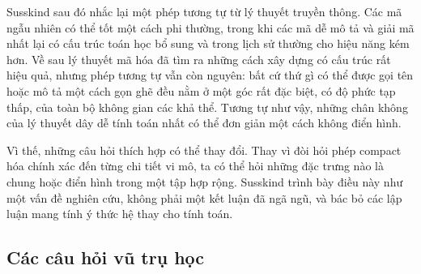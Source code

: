 Susskind sau đó nhắc lại một phép tương tự từ lý thuyết truyền thông. Các mã ngẫu nhiên có thể tốt một cách phi thường, trong khi các mã dễ mô tả và giải mã nhất lại có cấu trúc toán học bổ sung và trong lịch sử thường cho hiệu năng kém hơn. Về sau lý thuyết mã hóa đã tìm ra những cách xây dựng có cấu trúc rất hiệu quả, nhưng phép tương tự vẫn còn nguyên: bất cứ thứ gì có thể được gọi tên hoặc mô tả một cách gọn ghẽ đều nằm ở một góc rất đặc biệt, có độ phức tạp thấp, của toàn bộ không gian các khả thể. Tương tự như vậy, những chân không của lý thuyết dây dễ tính toán nhất có thể đơn giản một cách không điển hình.

Vì thế, những câu hỏi thích hợp có thể thay đổi. Thay vì đòi hỏi phép compact hóa chính xác đến từng chi tiết vi mô, ta có thể hỏi những đặc trưng nào là chung hoặc điển hình trong một tập hợp rộng. Susskind trình bày điều này như một vấn đề nghiên cứu, không phải một kết luận đã ngã ngũ, và bác bỏ các lập luận mang tính ý thức hệ thay cho tính toán.

\subsection{Các câu hỏi vũ trụ học}

\begin{classroomqa}
\end{classroomqa}

\begin{classroomqa}
\end{classroomqa}


